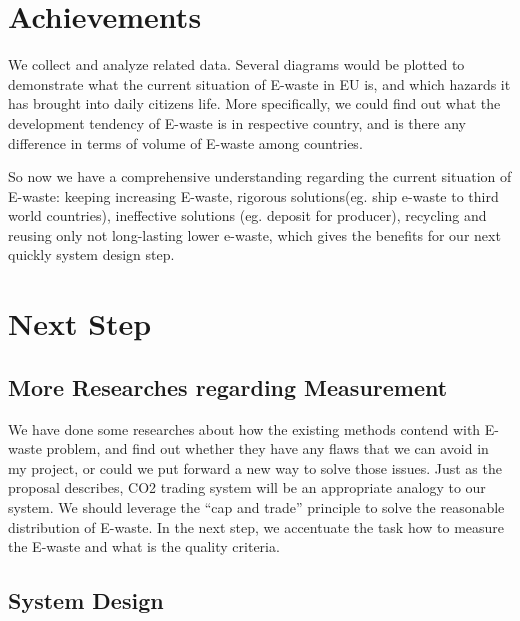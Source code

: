\documentclass[sigchi-a, authorversion]{acmart}
\begin{document}

\maketitle

\section{Achievements}

We collect and analyze related data. Several diagrams would be plotted to demonstrate
what the current situation of E-waste in EU is, and which hazards it has brought into
daily citizens life. More specifically, we could find out what the development tendency
of E-waste is in respective country, and is there any difference in terms of volume of
E-waste among countries. 

So now we have a comprehensive understanding regarding the current situation of E-waste: 
keeping increasing E-waste, rigorous solutions(eg. ship e-waste to third world 
countries)\cite{Robinson2009}, ineffective solutions (eg. deposit for producer), 
recycling and reusing only not long-lasting lower e-waste\cite{kahhat2008exploring, BMUB},
which gives the benefits for our next quickly system design step.

\section{Next Step}

\subsection{More Researches regarding Measurement}

We have done some researches about how the existing methods \cite{DUH, NABU} 
contend with E-waste problem, and find out whether they have any flaws that we 
can avoid in my project, or could we put forward a new way to solve those issues. 
Just as the proposal describes, CO2 trading system will be an appropriate analogy 
to our system. We should leverage the  ``cap and trade'' principle to solve the 
reasonable distribution of E-waste. In the next step, we accentuate the task how 
to measure the E-waste and what is the quality criteria.

\subsection{System Design}
\end{document}
